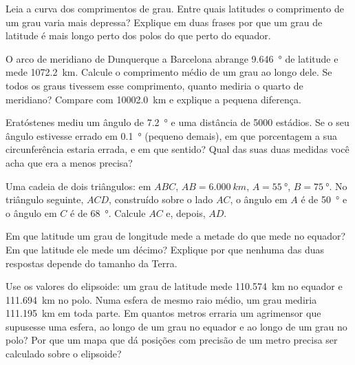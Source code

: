 \begin{exercise}[$\star\star$]\label{exo:g10:measuring-the-earth:10}
Leia a curva dos comprimentos de grau. Entre quais latitudes o comprimento
de um grau varia mais depressa? Explique em duas frases por que um grau de
latitude é mais longo perto dos polos do que perto do equador.
\end{exercise}

\begin{exercise}[$\star\star$]\label{exo:g10:measuring-the-earth:11}
O arco de meridiano de Dunquerque a Barcelona abrange \qty{9.646}{\degree}
de latitude e mede \qty{1072.2}{km}. Calcule o comprimento médio de um grau
ao longo dele. Se todos os graus tivessem esse comprimento, quanto mediria
o quarto de meridiano? Compare com \qty{10002.0}{km} e explique a pequena
diferença.
\end{exercise}

\begin{exercise}[$\star\star\star$]\label{exo:g10:measuring-the-earth:12}
Eratóstenes mediu um ângulo de \qty{7.2}{\degree} e uma distância de 5000
estádios. Se o seu ângulo estivesse errado em \qty{0.1}{\degree} (pequeno
demais), em que porcentagem a sua circunferência estaria errada, e em que
sentido? Qual das suas duas medidas você acha que era a menos precisa?
\end{exercise}

\begin{exercise}[$\star\star\star$]\label{exo:g10:measuring-the-earth:13}
Uma cadeia de dois triângulos: em $ABC$, $AB = \qty{6.000}{km}$,
$A = \qty{55}{\degree}$, $B = \qty{75}{\degree}$. No triângulo seguinte,
$ACD$, construído sobre o lado $AC$, o ângulo em $A$ é de
\qty{50}{\degree} e o ângulo em $C$ é de \qty{68}{\degree}. Calcule $AC$
e, depois, $AD$.
\end{exercise}

\begin{exercise}[$\star\star\star$]\label{exo:g10:measuring-the-earth:14}
Em que latitude um grau de longitude mede a metade do que mede no equador?
Em que latitude ele mede um décimo? Explique por que nenhuma das duas
respostas depende do tamanho da Terra.
\end{exercise}

\begin{exercise}[$\star\star\star$]\label{exo:g10:measuring-the-earth:15}
Use os valores do elipsoide: um grau de latitude mede \qty{110.574}{km} no
equador e \qty{111.694}{km} no polo. Numa esfera de mesmo raio médio, um
grau mediria \qty{111.195}{km} em toda parte. Em quantos metros erraria um
agrimensor que supusesse uma esfera, ao longo de um grau no equador e ao
longo de um grau no polo? Por que um mapa que dá posições com precisão de
um metro precisa ser calculado sobre o elipsoide?
\end{exercise}

